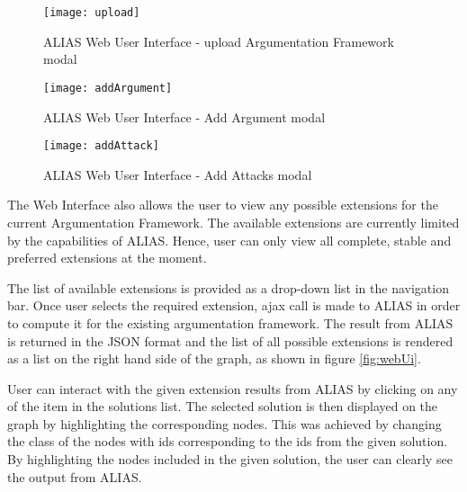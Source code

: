 \begin{figure}
	\centering
	\texttt{[image: upload]}
	\caption{ALIAS Web User Interface - upload Argumentation Framework modal}
	\label{fig:upload}
\end{figure}

\begin{figure}
	\centering
	\texttt{[image: addArgument]}
	\caption{ALIAS Web User Interface - Add Argument modal}
	\label{fig:addArgument}
\end{figure}

\begin{figure}
	\centering
	\texttt{[image: addAttack]}
	\caption{ALIAS Web User Interface - Add Attacks modal}
	\label{fig:addAttacks}
\end{figure}

The Web Interface also allows the user to view any possible extensions for the current Argumentation Framework. The available extensions are currently limited by the capabilities of ALIAS. Hence, user can only view all complete, stable and preferred extensions at the moment. 

The list of available extensions is provided as a drop-down list in the navigation bar. Once user selects the required extension, ajax call is made to ALIAS in order to compute it for the existing argumentation framework. The result from ALIAS is returned in the JSON format and the list of all possible extensions is rendered as a list on the right hand side of the graph, as shown in figure \ref{fig:webUi}.

User can interact with the given extension results from ALIAS by clicking on any of the item in the solutions list. The selected solution is then displayed on the graph by highlighting the corresponding nodes. This was achieved by changing the class of the nodes with ids corresponding to the ids from the given solution. By highlighting the nodes included in the given solution, the user can clearly see the output from ALIAS.